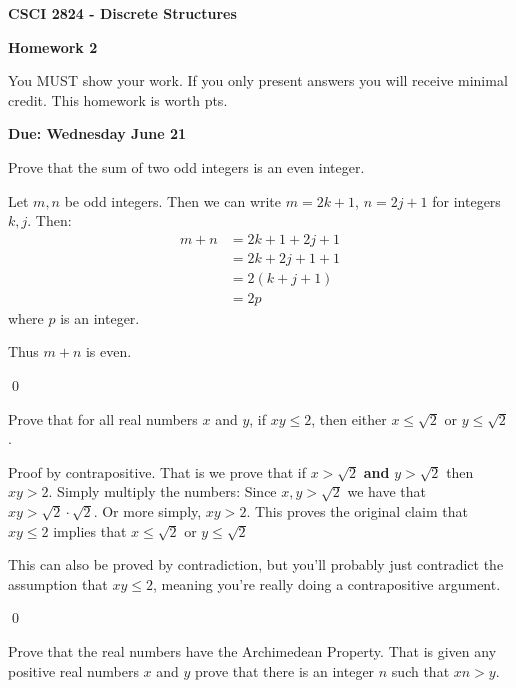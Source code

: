 \documentclass[addpoints]{exam}
\begin{document}
\singlespacing

\begin{center}
  {\large\textbf{CSCI 2824 - Discrete Structures}}

  {\large\textbf{Homework 2}}
\end{center}

You MUST show your work. If you only present answers you will receive minimal credit. This homework is worth \numpoints pts.

\textbf{Due: Wednesday June 21}

\begin{questions}
  \question[2]\label{qn:1} Prove that the sum of two odd integers is an even
  integer.
    \vspace*{\fill}
    \begin{solution}
      Let $m,n$ be odd integers. Then we can write $m = 2k+1$, $n= 2j+1$ for
      integers $k,j$. Then:
      \begin{align*}
        m + n &= 2k+1 + 2j+1\\
        &= 2k + 2j + 1 + 1\\
        &= 2(k+j + 1)\\
        &= 2p
      \end{align*}
      where $p$ is an integer.

      Thus $m + n$ is even.

      \qed
    \end{solution}

  \question[4] Prove that for all real numbers $x$ and $y$, if $xy \leq 2$, then either $x\leq \sqrt{2}$ or $y \leq \sqrt{2}$.
    \vspace*{\fill}

    \begin{solution}
      Proof by contrapositive. That is we prove that if $x > \sqrt{2}$ \textbf{and} $y > \sqrt{2}$ then $xy > 2$. Simply multiply the numbers: Since $x,y > \sqrt{2}$ we have that $xy>\sqrt{2}\cdot\sqrt{2}$. Or more simply, $xy > 2$. This proves the original claim that $xy \leq 2$ implies that $x \leq \sqrt{2}$ or $y\leq \sqrt{2}$

      This can also be proved by contradiction, but you'll probably just contradict the assumption that $xy \leq 2$, meaning you're really doing a contrapositive argument.

      \qed
    \end{solution}

  \question[10] Prove that the real numbers have the Archimedean Property. That
  is given any positive real numbers $x$ and $y$ prove that there is an integer
  $n$ such that $xn > y$.
  \vspace*{\fill}


\end{questions}
\end{document}

